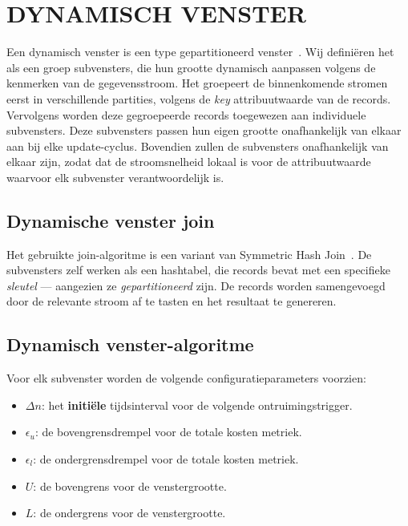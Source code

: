 \section{DYNAMISCH VENSTER}%
\label{sec:Dynamic Window}
Een dynamisch venster is een type gepartitioneerd venster~\cite{generic_window_sem}.
Wij definiëren het als een groep subvensters, die hun grootte dynamisch aanpassen volgens de kenmerken 
van de gegevensstroom. Het groepeert de binnenkomende stromen eerst in verschillende partities, volgens 
de \emph{key} attribuutwaarde van de records. Vervolgens worden deze gegroepeerde records toegewezen 
aan individuele subvensters. Deze subvensters passen hun eigen grootte onafhankelijk van elkaar aan 
bij elke update-cyclus. Bovendien zullen de subvensters onafhankelijk van elkaar zijn, zodat 
dat de stroomsnelheid lokaal is voor de attribuutwaarde waarvoor elk subvenster verantwoordelijk is. 

\subsection{Dynamische venster join}
\label{sub:Dynamic window join}

Het gebruikte join-algoritme is een variant van Symmetric Hash Join~\cite{symmetric_hash_join}. 
De subvensters zelf werken als een hashtabel, die records bevat met een 
specifieke \emph{sleutel} --- aangezien ze \emph{gepartitioneerd} zijn. 
De records worden samengevoegd door de relevante stroom af te tasten en het 
resultaat te genereren. 


\subsection{Dynamisch venster-algoritme}%
\label{sub:Dynamic window algorithm}
Voor elk subvenster worden de volgende configuratieparameters 
voorzien: 

\begin{itemize}
    \item $\Delta n$: het \textbf{initiële} tijdsinterval voor de volgende ontruimingstrigger. 
    \item $\epsilon_u$: de bovengrensdrempel voor de totale kosten metriek.
    \item $\epsilon_l$: de ondergrensdrempel voor de totale kosten metriek. 
    \item $U$: de bovengrens voor de venstergrootte. 
    \item $L$: de ondergrens voor de venstergrootte. 
\end{itemize}

